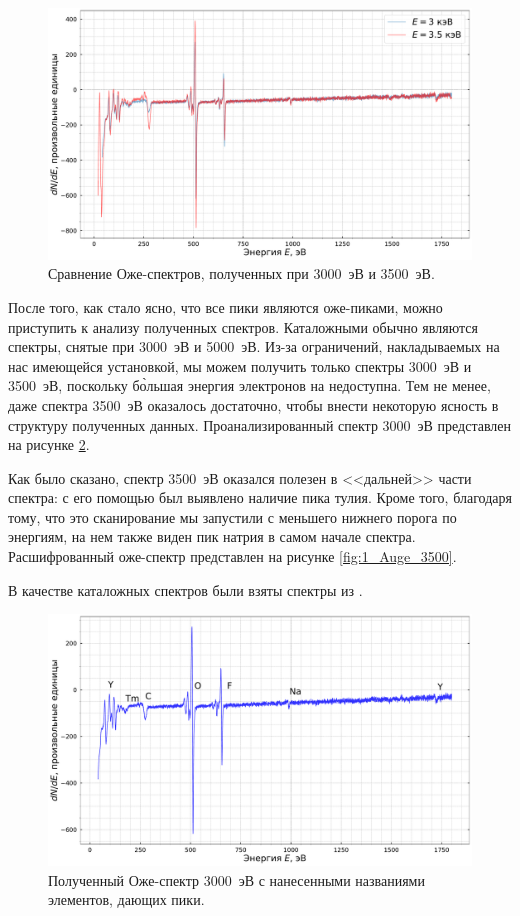\documentclass[a4paper, 12pt]{article}
\begin{document}
\begin{figure}[H]
	\centering
	\includegraphics[width=0.9\linewidth]{1_Auge_double}
	\caption{Сравнение Оже-спектров, полученных при 3000~эВ и 3500~эВ.}
	\label{fig:1_Auge_double}
\end{figure}

После того, как стало ясно, что все пики являются оже-пиками, можно приступить к анализу полученных спектров. Каталожными обычно являются спектры, снятые при 3000~эВ и 5000~эВ. Из-за ограничений, накладываемых на нас имеющейся установкой, мы можем получить только спектры 3000~эВ и 3500~эВ, поскольку б\`{о}льшая энергия электронов на недоступна. Тем не менее, даже спектра 3500~эВ оказалось достаточно, чтобы внести некоторую ясность в структуру полученных данных. Проанализированный спектр 3000~эВ представлен на рисунке \ref{fig:1_Auge_3000}.

Как было сказано, спектр 3500~эВ оказался полезен в <<дальней>> части спектра: с его помощью был выявлено наличие пика тулия. Кроме того, благодаря тому, что это сканирование мы запустили с меньшего нижнего порога по энергиям, на нем также виден пик натрия в самом начале спектра. Расшифрованный оже-спектр представлен на рисунке \ref{fig:1_Auge_3500}. 

В качестве каталожных спектров были взяты спектры из \cite{Auger}.

\begin{figure}[H]
	\centering
	\includegraphics[width=0.9\linewidth]{1_Auge_3000}
	\caption{Полученный Оже-спектр 3000~эВ с нанесенными названиями элементов, дающих пики.}
	\label{fig:1_Auge_3000}
\end{figure}
\end{document}
